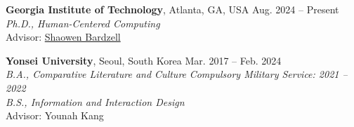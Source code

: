 \textbf{Georgia Institute of Technology}, Atlanta, GA, USA \hfill{Aug. 2024 -- Present}\\
\textit{Ph.D., Human-Centered Computing}\\
Advisor: \href{https://www.shaowenbardzell.com/}{Shaowen Bardzell} \\ 

\vspace{-0.25cm}

\noindent \textbf{Yonsei University}, Seoul, South Korea \hfill{Mar. 2017 -- Feb. 2024}\\
\textit{B.A., Comparative Literature and Culture} \hfill{\textit{Compulsory Military Service: 2021 -- 2022}}\\
\textit{B.S., Information and Interaction Design} \\
Advisor: Younah Kang \\